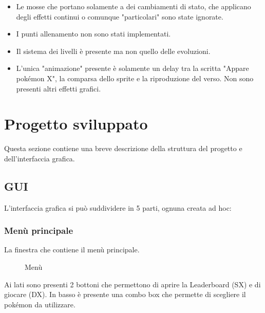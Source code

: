 \documentclass{article}
\begin{document}
\begin{itemize}

\item Le mosse che portano solamente a dei cambiamenti di stato, che applicano degli effetti continui o comunque "particolari" sono state ignorate.

\item I punti allenamento non sono stati implementati.

\item Il sistema dei livelli è presente ma non quello delle evoluzioni.

\item L'unica "animazione" presente è solamente un delay tra la scritta "Appare pokémon X", la comparsa dello sprite e la riproduzione del verso. Non sono presenti altri effetti grafici.

\end{itemize}

\section{Progetto sviluppato}

Questa sezione contiene una breve descrizione della struttura del progetto e dell'interfaccia grafica.
    
\vspace{10pt}

\subsection{GUI}
    
    L'interfaccia grafica si può suddividere in 5 parti, ognuna creata ad hoc:

    \subsubsection{Menù principale}

        La finestra che contiene il menù principale.

        \vspace{5pt}

        \begin{figure}[ht]
            \centering
            \caption{Menù}
            \label{fig:menu.png}
        \end{figure}

        Ai lati sono presenti 2 bottoni che permettono di aprire la Leaderboard (SX) e di giocare (DX). In basso è presente una combo box che permette di scegliere il pokémon da utilizzare.
\end{document}
